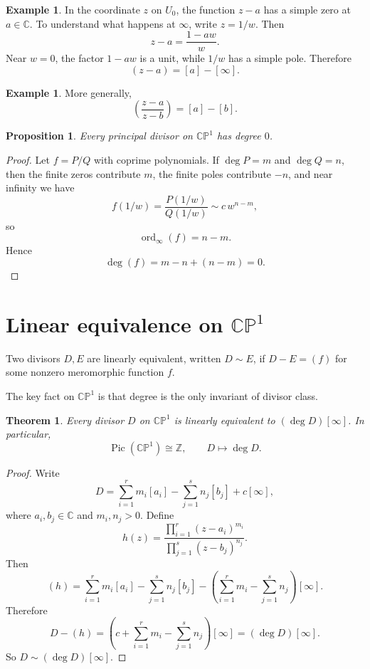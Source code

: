 \documentclass[11pt]{article}
\newcommand{\C}{\mathbb{C}}
\newcommand{\CP}{\mathbb{CP}}
\newcommand{\Pic}{\operatorname{Pic}}
\newcommand{\ord}{\operatorname{ord}}
\newcommand{\degd}{\operatorname{deg}}
\newcommand{\CPone}{\CP^1}
\theoremstyle{definition}
\newtheorem{example}[definition]{Example}
\theoremstyle{plain}
\newtheorem{theorem}[definition]{Theorem}
\newtheorem{proposition}[definition]{Proposition}
\begin{document}
\begin{example}
In the coordinate $z$ on $U_0$, the function $z-a$ has a simple zero at $a\in \C$. To understand what happens at $\infty$, write $z=1/w$. Then
\[
z-a=\frac{1-aw}{w}.
\]
Near $w=0$, the factor $1-aw$ is a unit, while $1/w$ has a simple pole. Therefore
\[
(z-a)=[a]-[\infty].
\]
\end{example}

\begin{example}
More generally,
\[
\left(\frac{z-a}{z-b}\right)=[a]-[b].
\]
\end{example}

\begin{proposition}
Every principal divisor on $\CPone$ has degree $0$.
\end{proposition}

\begin{proof}
Let $f=P/Q$ with coprime polynomials. If $\deg P=m$ and $\deg Q=n$, then the finite zeros contribute $m$, the finite poles contribute $-n$, and near infinity we have
\[
f(1/w)=\frac{P(1/w)}{Q(1/w)}\sim c\,w^{n-m},
\]
so
\[
\ord_{\infty}(f)=n-m.
\]
Hence
\[
\degd (f)=m-n+(n-m)=0.
\]
\end{proof}

\section{Linear equivalence on \texorpdfstring{$\CPone$}{CP1}}
Two divisors $D,E$ are linearly equivalent, written $D\sim E$, if $D-E=(f)$ for some nonzero meromorphic function $f$.

The key fact on $\CPone$ is that degree is the only invariant of divisor class.

\begin{theorem}
Every divisor $D$ on $\CPone$ is linearly equivalent to $(\degd D)[\infty]$.
In particular,
\[
\Pic(\CPone)\cong \mathbb Z,
\qquad
D\longmapsto \degd D.
\]
\end{theorem}

\begin{proof}
Write
\[
D=\sum_{i=1}^r m_i[a_i]-\sum_{j=1}^s n_j[b_j]+c[\infty],
\]
where $a_i,b_j\in \C$ and $m_i,n_j>0$. Define
\[
h(z)=\frac{\prod_{i=1}^r (z-a_i)^{m_i}}{\prod_{j=1}^s (z-b_j)^{n_j}}.
\]
Then
\[
(h)=\sum_{i=1}^r m_i[a_i]-\sum_{j=1}^s n_j[b_j]-\left(\sum_{i=1}^r m_i-\sum_{j=1}^s n_j\right)[\infty].
\]
Therefore
\[
D-(h)=\left(c+\sum_{i=1}^r m_i-\sum_{j=1}^s n_j\right)[\infty]= (\degd D)[\infty].
\]
So $D\sim (\degd D)[\infty]$.
\end{proof}
\end{document}

